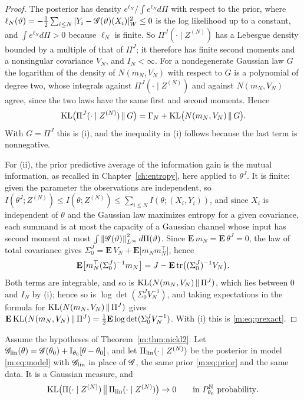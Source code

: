\begin{proof}
The posterior has density $e^{\ell_N}/\int e^{\ell_N}d\Pi$ with respect to the prior, where $\ell_N(\vartheta)=-\tfrac12\sum_{i\le N}|Y_i-\mathscr{G}(\vartheta)(X_i)|_W^2\le0$ is the log likelihood up to a constant, and $\int e^{\ell_N}d\Pi>0$ because $\ell_N$ is finite. So $\Pi^J(\cdot\mid Z^{(N)})$ has a Lebesgue density bounded by a multiple of that of $\Pi^J$; it therefore has finite second moments and a nonsingular covariance $V_N$, and $I_N<\infty$. For a nondegenerate Gaussian law $G$ the logarithm of the density of $N(m_N,V_N)$ with respect to $G$ is a polynomial of degree two, whose integrals against $\Pi^J(\cdot\mid Z^{(N)})$ and against $N(m_N,V_N)$ agree, since the two laws have the same first and second moments. Hence
\[
\mathrm{KL}\big(\Pi^J(\cdot\mid Z^{(N)})\,\|\,G\big)=\Gamma_N+\mathrm{KL}\big(N(m_N,V_N)\,\|\,G\big).
\]
With $G=\Pi^J$ this is (i), and the inequality in (i) follows because the last term is nonnegative.

For (ii), the prior predictive average of the information gain is the mutual information, as recalled in Chapter~\ref{ch:entropy}, here applied to $\theta^J$. It is finite: given the parameter the observations are independent, so $I(\theta^J;Z^{(N)})\le I(\theta;Z^{(N)})\le\sum_{i\le N}I(\theta;(X_i,Y_i))$, and since $X_i$ is independent of $\theta$ and the Gaussian law maximizes entropy for a given covariance, each summand is at most the capacity of a Gaussian channel whose input has second moment at most $\int\left\|\mathscr{G}(\vartheta)\right\|^2_{L^\infty}d\Pi(\vartheta)$. Since $\mathbf E\,m_N=\mathbf E\,\theta^J=0$, the law of total covariance gives $\Sigma^J_0=\mathbf E\,V_N+\mathbf E\big[m_Nm_N^\top\big]$, hence
\[
\mathbf E\big[m_N^\top(\Sigma^J_0)^{-1}m_N\big]=J-\mathbf E\,\mathrm{tr}\big((\Sigma^J_0)^{-1}V_N\big).
\]
Both terms are integrable, and so is $\mathrm{KL}(N(m_N,V_N)\,\|\,\Pi^J)$, which lies between $0$ and $I_N$ by (i); hence so is $\log\det(\Sigma^J_0V_N^{-1})$, and taking expectations in the formula for $\mathrm{KL}(N(m_N,V_N)\,\|\,\Pi^J)$ gives $\mathbf E\,\mathrm{KL}(N(m_N,V_N)\,\|\,\Pi^J)=\tfrac12\mathbf E\log\det(\Sigma^J_0V_N^{-1})$. With (i) this is \eqref{m:eq:prexact}.
\end{proof}

\begin{theorem}\label{m:thm:prkl}
Assume the hypotheses of Theorem~\ref{m:thm:nickl2}. Let $\mathscr{G}_{\rm lin}(\theta)=\mathscr{G}(\theta_0)+\mathbb{I}_{\theta_0}[\theta-\theta_0]$, and let $\Pi_{\rm lin}(\cdot\mid Z^{(N)})$ be the posterior in model \eqref{m:eq:model} with $\mathscr{G}_{\rm lin}$ in place of $\mathscr{G}$, the same prior \eqref{m:eq:prior} and the same data. It is a Gaussian measure, and
\begin{equation}\label{m:eq:prkl}
\mathrm{KL}\big(\Pi(\cdot\mid Z^{(N)})\,\big\|\,\Pi_{\rm lin}(\cdot\mid Z^{(N)})\big)\to0\qquad\text{in }P^{\mathbb{N}}_{\theta_0}\text{ probability}.
\end{equation}
\end{theorem}

